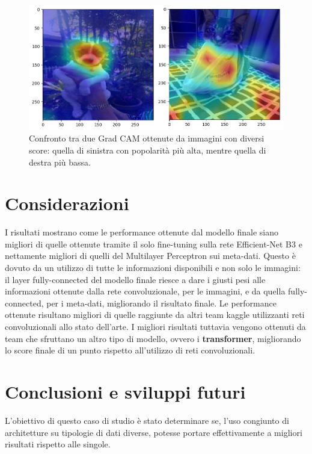 \begin{figure}[h]
        \centering
        \includegraphics[scale=0.6]{Plot/GRAD-CAM.png}
        \caption{Confronto tra due Grad CAM ottenute da immagini con diversi score: quella di sinistra con popolarità più alta, mentre quella di destra più bassa.}
        \label{fig:grad-cam}
\end{figure}
    

    
    
\newpage


\section{Considerazioni}

I risultati mostrano come le performance ottenute dal modello finale siano migliori di quelle ottenute tramite il solo fine-tuning sulla rete Efficient-Net B3 e nettamente migliori di quelli del Multilayer Perceptron sui meta-dati. Questo è dovuto da un utilizzo di tutte le informazioni disponibili e non solo le immagini: il layer fully-connected del modello finale riesce a dare i giusti pesi alle informazioni ottenute dalla rete convoluzionale, per le immagini, e da quella fully-connected, per i meta-dati, migliorando il risultato finale. Le performance ottenute risultano migliori di quelle raggiunte da altri team kaggle utilizzanti reti convoluzionali allo stato dell'arte. I migliori risultati tuttavia vengono ottenuti da team che sfruttano un altro tipo di modello, ovvero i \textbf{transformer}, migliorando lo score finale di un punto rispetto all'utilizzo di reti convoluzionali.


\section{Conclusioni e sviluppi futuri}
L'obiettivo di questo caso di studio è stato determinare se, l'uso congiunto di architetture su tipologie di dati diverse, potesse portare effettivamente a migliori risultati rispetto
alle singole.


